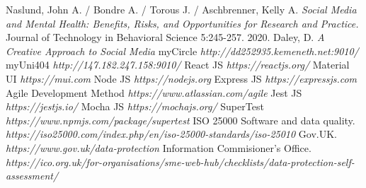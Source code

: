\documentclass[lettersize,journal]{IEEEtran}
\begin{document}
\begin{thebibliography}{}
	Naslund, John A. / Bondre A. / Torous J. / Aschbrenner, Kelly A. {\it{Social Media and Mental Health: Benefits, Risks, and Opportunities for Research and Practice.}} Journal of Technology in Behavioral Science 5:245-257.
	2020.
	Daley, D. {\it{A Creative Approach to Social Media}}
	myCircle
	{\it{http://dd252935.kemeneth.net:9010/}}
    myUni404
    {\it{http://147.182.247.158:9010/}}
	React JS
	{\it{https://reactjs.org/}}
	Material UI
	{\it{https://mui.com}}
	Node JS
	{\it{https://nodejs.org}}
	Express JS
	{\it{https://expressjs.com}}
	Agile Development Method
	{\it{https://www.atlassian.com/agile}}
	Jest JS
	{\it{https://jestjs.io/}}
	Mocha JS
	{\it{https://mochajs.org/}}
	SuperTest
	{\it{https://www.npmjs.com/package/supertest}}
	ISO 25000 Software and data quality.
	{\it{https://iso25000.com/index.php/en/iso-25000-standards/iso-25010}}
	Gov.UK. {\it{https://www.gov.uk/data-protection}}
	Information Commisioner's Office. {\it{https://ico.org.uk/for-organisations/sme-web-hub/checklists/data-protection-self-assessment/}}

\end{thebibliography}
\newpage
\newpage
\clearpage
\appendices
\newpage
\onecolumn
\end{document}
